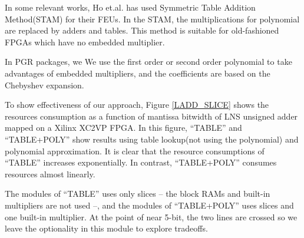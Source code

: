 \documentclass{llncs}
\begin{document}
In some relevant works,
Ho et.al.\cite{THYL04} has used Symmetric Table Addition Method(STAM)\cite{SS99} for their FEUs.
In the STAM, the multiplications for polynomial are replaced by adders and tables. This method is  
suitable for old-fashioned FPGAs which have no embedded multiplier.

In PGR packages, we We use the first order or second order polynomial
to take advantages of embedded multipliers, and the coefficients are
based on the Chebyshev expansion. 

To show effectiveness of our approach, Figure \ref{LADD_SLICE} shows
the resources consumption as a function of mantissa bitwidth of LNS
unsigned adder mapped on a Xilinx XC2VP FPGA.  In this figure,
``TABLE'' and ``TABLE+POLY'' show results using table lookup(not using
the polynomial) and polynomial approximation.
It is clear that the resource consumptions  of ``TABLE'' increases exponentially. 
In contrast, ``TABLE+POLY'' consumes resources almost linearly.

The modules of ``TABLE'' uses only slices -- the block RAMs and
built-in multipliers are not used --, and the modules of ``TABLE+POLY''
uses slices and one built-in multiplier.  At the point of near 5-bit,
the two lines are crossed so we leave the optionality in this module
to explore tradeoffs.
\end{document}
